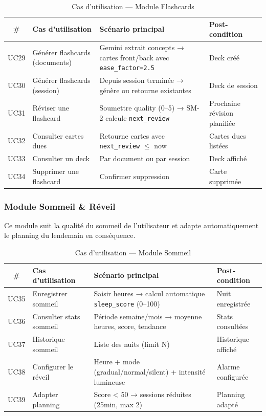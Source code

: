 \documentclass[12pt,a4paper]{report}
\begin{document}
\begin{table}[H]
    \centering
    \caption{Cas d'utilisation — Module Flashcards}
    \renewcommand{\arraystretch}{1.3}
    \begin{tabular}{|c|p{3.5cm}|p{4.5cm}|p{3.5cm}|}
        \hline
        \textbf{\#} & \textbf{Cas d'utilisation} & \textbf{Scénario principal} & \textbf{Post-condition} \\
        \hline
        UC29 & Générer flashcards (documents) & Gemini extrait concepts → cartes front/back avec \texttt{ease\_factor=2.5} & Deck créé \\
        \hline
        UC30 & Générer flashcards (session) & Depuis session terminée → génère ou retourne existantes & Deck de session \\
        \hline
        UC31 & Réviser une flashcard & Soumettre quality (0–5) → SM-2 calcule \texttt{next\_review} & Prochaine révision planifiée \\
        \hline
        UC32 & Consulter cartes dues & Retourne cartes avec \texttt{next\_review} $\leq$ now & Cartes dues listées \\
        \hline
        UC33 & Consulter un deck & Par document ou par session & Deck affiché \\
        \hline
        UC34 & Supprimer une flashcard & Confirmer suppression & Carte supprimée \\
        \hline
    \end{tabular}
\end{table}

\subsubsection{Module Sommeil \& Réveil}

Ce module suit la qualité du sommeil de l'utilisateur et adapte automatiquement le planning du lendemain en conséquence.

\begin{table}[H]
    \centering
    \caption{Cas d'utilisation — Module Sommeil}
    \renewcommand{\arraystretch}{1.3}
    \begin{tabular}{|c|p{3.5cm}|p{4.5cm}|p{3.5cm}|}
        \hline
        \textbf{\#} & \textbf{Cas d'utilisation} & \textbf{Scénario principal} & \textbf{Post-condition} \\
        \hline
        UC35 & Enregistrer sommeil & Saisir heures → calcul automatique \texttt{sleep\_score} (0–100) & Nuit enregistrée \\
        \hline
        UC36 & Consulter stats sommeil & Période semaine/mois → moyenne heures, score, tendance & Stats consultées \\
        \hline
        UC37 & Historique sommeil & Liste des nuits (limit N) & Historique affiché \\
        \hline
        UC38 & Configurer le réveil & Heure + mode (gradual/normal/silent) + intensité lumineuse & Alarme configurée \\
        \hline
        UC39 & Adapter planning & Score < 50 → sessions réduites (25min, max 2) & Planning adapté \\
        \hline
    \end{tabular}
\end{table}
\end{document}
